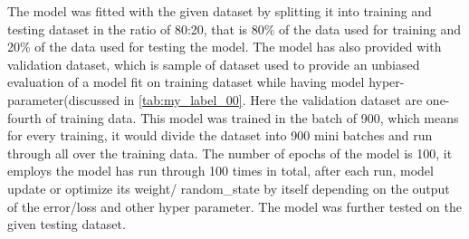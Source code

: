 The model was fitted with the given dataset by splitting it into training and testing dataset in the ratio of 80:20, that is 80\% of the data used for training and 20\% of the data used for testing the model. The model has also provided with validation dataset, which is sample of dataset used to provide an unbiased evaluation of a model fit on training dataset while having model hyper-parameter(discussed in \autoref{tab:my_label_00}. Here the validation dataset are one-fourth of training data. This model was trained in the batch of 900, which means for every training, it would divide the dataset into 900 mini batches and run through all over the training data. The number of epochs of the model is 100, it employs the model has run through 100 times in total, after each run, model update or optimize its weight/ random\_state by itself  depending on the output of the error/loss and other hyper parameter. The model was further tested on the given testing dataset.  
   
